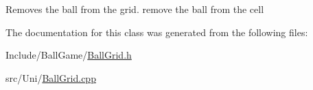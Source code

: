 Removes the ball from the grid. remove the ball from the cell 

The documentation for this class was generated from the following files:\begin{DoxyCompactItemize}
\item 
Include/BallGame/\hyperlink{BallGrid_8h}{BallGrid.h}\item 
src/Uni/\hyperlink{BallGrid_8cpp}{BallGrid.cpp}\end{DoxyCompactItemize}
